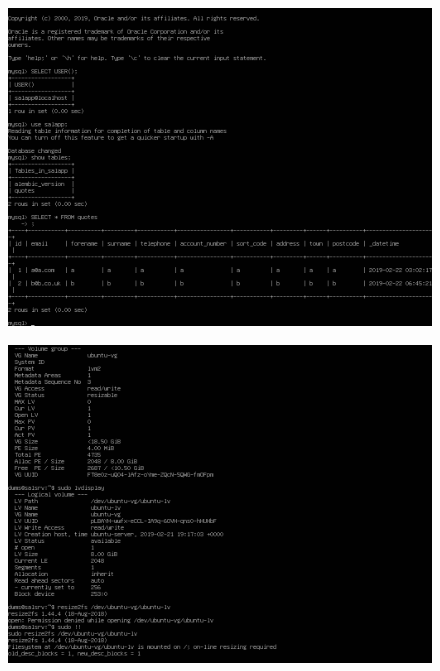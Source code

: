 \begin{figure}[h!]
\centering
\captionsetup{skip=\skipfigurecaptionlen}
\includegraphics[width=1\textwidth]{screenshots/IY2D502-2019-02-22-06-50-24.png}
\caption{}
\label{fig:IY2D502-2019-02-22-06-50-24}
\end{figure}
\pagebreak
\begin{figure}[h!]
\centering
\captionsetup{skip=\skipfigurecaptionlen}
\includegraphics[width=1\textwidth]{screenshots/IY2D502-2019-02-22-23-39-52.png}
\caption{}
\label{fig:IY2D502-2019-02-22-23-39-52}
\end{figure}
\pagebreak
